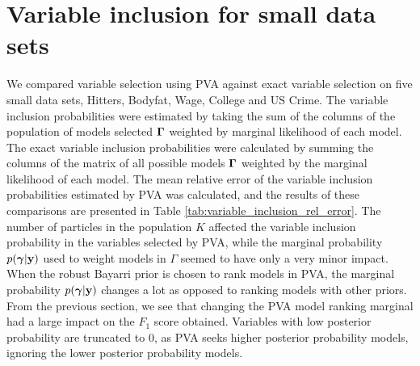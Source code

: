 

\section{Variable inclusion for small data sets}

We compared variable selection using PVA against exact variable selection on five small data sets,
Hitters, Bodyfat, Wage, College and US Crime. 
The variable inclusion probabilities were estimated by taking the sum of the columns of the population
of models selected ${\boldsymbol \Gamma}$
weighted by marginal likelihood of each model.
The exact variable inclusion probabilities were calculated by summing the columns of the matrix of all possible
models ${\boldsymbol \Gamma}$ weighted by the marginal likelihood of each model.
The mean relative error of the variable inclusion probabilities estimated by PVA was calculated,
and the results of these comparisons are presented in Table \ref{tab:variable_inclusion_rel_error}.
The number of particles in the population $K$ affected the
variable inclusion probability in the variables selected by PVA, while the marginal probability
$p({\boldsymbol \gamma} | {\bf y})$ used to weight models in $\Gamma$ seemed to have only a very minor impact.
When the robust Bayarri prior is chosen to rank models in PVA,
the marginal probability $p({\boldsymbol \gamma} | {\bf y})$ changes a lot as opposed to ranking models with other priors.
From the previous section, we see that changing the PVA model ranking
marginal had a large impact on the $F_1$ score obtained.
Variables with low posterior probability are truncated to 0, as PVA seeks higher posterior probability models,
ignoring the lower posterior probability models.

